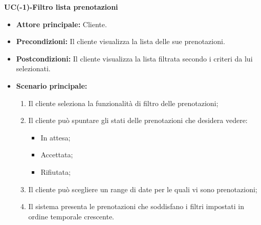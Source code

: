 \textbf{UC(-1)-Filtro lista prenotazioni}
\begin{itemize}
    \item \textbf{Attore principale: } Cliente.
    \item \textbf{Precondizioni: }Il cliente visualizza la lista delle sue prenotazioni.
    \item \textbf{Postcondizioni: }Il cliente visualizza la lista filtrata secondo i criteri da lui selezionati.
    \item \textbf{Scenario principale:} 
        \begin{enumerate}
            \item Il cliente seleziona la funzionalità di filtro delle prenotazioni;
            \item Il cliente può spuntare gli stati delle prenotazioni che desidera vedere:
              \begin{itemize}
                \item In attesa;
                \item Accettata;
                \item Rifiutata;
              \end{itemize}
            \item Il cliente può scegliere un range di date per le quali vi sono prenotazioni;
            \item Il sistema presenta le prenotazioni che soddisfano i filtri impostati in ordine temporale crescente.
        \end{enumerate}
\end{itemize}

